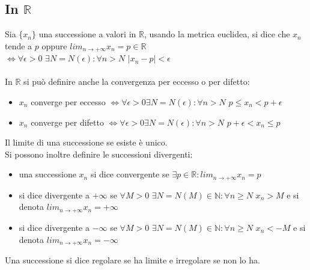 \documentclass{article}
\begin{document}
\subsection{In $\mathds{R}$}
Sia $\{x_n\}$ una successione a valori in $\mathds{R}$, usando la metrica euclidea, si dice che $x_n$ tende a $p$ oppure
$lim_{n\rightarrow+\infty}x_n=p\in\mathds{R}$\\
$\Leftrightarrow\forall\epsilon>0$ $\exists N=N(\epsilon):\forall n>N$ $|x_n-p|<\epsilon$\\\\
In $\mathds{R}$ si può definire anche la convergenza per eccesso o per difetto:\begin{itemize}
    \item $x_n$ converge per eccesso $\Leftrightarrow\forall\epsilon>0\exists N=N(\epsilon):\forall n>N$
    $ p\leq x_n <p+\epsilon$
    \item $x_n$ converge per difetto $\Leftrightarrow\forall\epsilon>0\exists N=N(\epsilon):\forall n>N$
    $ p+\epsilon<x_n \leq p$
\end{itemize}
Il limite di una successione se esiste è unico.\\
Si possono inoltre definire le successioni divergenti:\begin{itemize}
    \item una successione $x_n$ si dice convergente se $\exists p\in\mathds{R}: lim_{n\rightarrow+\infty}x_n=p$
    \item si dice divergente a $+\infty$ se $\forall M>0$ $\exists N=N(M)\in\mathds{N}: \forall n\geq N$ $x_n>M$ e si denota $lim_{n\rightarrow+\infty}x_n=+\infty$
    \item si dice divergente a $-\infty$ se $\forall M>0$ $\exists N=N(M)\in\mathds{N}: \forall n\geq N$ $x_n<-M$ e si denota $lim_{n\rightarrow+\infty}x_n=-\infty$
\end{itemize}
Una successione si dice regolare se ha limite e irregolare se non lo ha.
\end{document}
